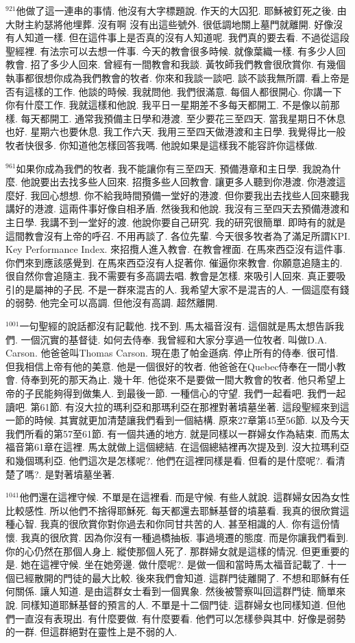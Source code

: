 \documentclass{book}
\begin{document}
$^{921}$他做了這一連串的事情.
他沒有大字標題說.
作天的大囚犯.
耶穌被釘死之後.
由大財主約瑟將他埋葬.
沒有啊 沒有出這些號外.
很低調地關上墓門就離開.
好像沒有人知道一樣.
但在這件事上是否真的沒有人知道呢.
我們真的要去看.
不過從這段聖經裡.
有法宗可以去想一件事.
今天的教會很多時候.
就像葉織一樣.
有多少人回教會.
招了多少人回來.
曾經有一間教會和我談.
黃牧師我們教會很欣賞你.
有幾個執事都很想你成為我們教會的牧者.
你來和我談一談吧.
談不談我無所謂.
看上帝是否有這樣的工作.
他談的時候.
我就問他.
我們很滿意.
每個人都很開心.
你講一下你有什麼工作.
我就這樣和他說.
我平日一星期差不多每天都開工.
不是像以前那樣.
每天都開工.
通常我預備主日學和港渡.
至少要花三至四天.
當我星期日不休息也好.
星期六也要休息.
我工作六天.
我用三至四天做港渡和主日學.
我覺得比一般牧者快很多.
你知道他怎樣回答我嗎.
他說如果是這樣我不能容許你這樣做.

$^{961}$如果你成為我們的牧者.
我不能讓你有三至四天.
預備港章和主日學.
我說為什麼.
他說要出去找多些人回來.
招攬多些人回教會.
讓更多人聽到你港渡.
你港渡這麼好.
我回心想想.
你不給我時間預備一堂好的港渡.
但你要我出去找些人回來聽我講好的港渡.
這兩件事好像自相矛盾.
然後我和他說.
我沒有三至四天去預備港渡和主日學.
我講不到一堂好的渡.
他說你要自己研究.
我的研究很簡單.
即時有的就是這間教會沒有上帝的呼召.
不用再談了.
各位先輩.
今天很多牧者為了滿足所謂KPI.
Key Performance Index.
來招攬人進入教會.
在教會裡面.
在馬來西亞沒有這件事.
你們來到應該感覺到.
在馬來西亞沒有人捉著你.
催逼你來教會.
你願意追隨主的.
很自然你會追隨主.
我不需要有多高調去唱.
教會是怎樣.
來吸引人回來.
真正要吸引的是屬神的子民.
不是一群來混吉的人.
我希望大家不是混吉的人.
一個這麼有錢的弱勢.
他完全可以高調.
但他沒有高調.
超然離開.

$^{1001}$一句聖經的說話都沒有記載他.
找不到.
馬太福音沒有.
這個就是馬太想告訴我們.
一個沉實的基督徒.
如何去侍奉.
我曾經和大家分享過一位牧者.
叫做D.A. Carson.
他爸爸叫Thomas Carson.
現在患了帕金遜病.
停止所有的侍奉.
很可惜.
但我相信上帝有他的美意.
他是一個很好的牧者.
他爸爸在Quebec侍奉在一間小教會.
侍奉到死的那天為止.
幾十年.
他從來不是要做一間大教會的牧者.
他只希望上帝的子民能夠得到做集人.
到最後一節.
一種信心的守望.
我們一起看吧.
我們一起讀吧.
第61節.
有沒大拉的瑪利亞和那瑪利亞在那裡對著墳墓坐著.
這段聖經來到這一節的時候.
其實就更加清楚讓我們看到一個結構.
原來27章第45至56節.
以及今天我們所看的第57至61節.
有一個共通的地方.
就是同樣以一群婦女作為結束.
而馬太福音第61章在這裡.
馬太就做上這個總結.
在這個總結裡再次提及到.
沒大拉瑪利亞和幾個瑪利亞.
他們這次是怎樣呢?.
他們在這裡同樣是看.
但看的是什麼呢?.
看清楚了嗎?.
是對著墳墓坐著.

$^{1041}$他們還在這裡守候.
不單是在這裡看.
而是守候.
有些人就說.
這群婦女因為女性比較感性.
所以他們不捨得耶穌死.
每天都還去耶穌基督的墳墓看.
我真的很欣賞這種心智.
我真的很欣賞你對你過去和你同甘共苦的人.
甚至相識的人.
你有這份情懷.
我真的很欣賞.
因為你沒有一種過橋抽板.
事過境遷的態度.
而是你讓我們看到.
你的心仍然在那個人身上.
縱使那個人死了.
那群婦女就是這樣的情況.
但更重要的是.
她在這裡守候.
坐在她旁邊.
做什麼呢?.
是做一個和當時馬太福音記載了.
十一個已經散開的門徒的最大比較.
後來我們會知道.
這群門徒離開了.
不想和耶穌有任何關係.
讓人知道.
是由這群女士看到一個異象.
然後被警察叫回這群門徒.
簡單來說.
同樣知道耶穌基督的預言的人.
不單是十二個門徒.
這群婦女也同樣知道.
但他們一直沒有表現出.
有什麼要做.
有什麼要看.
他們可以怎樣參與其中.
好像是弱勢的一群.
但這群絕對在靈性上是不弱的人.
\end{document}
